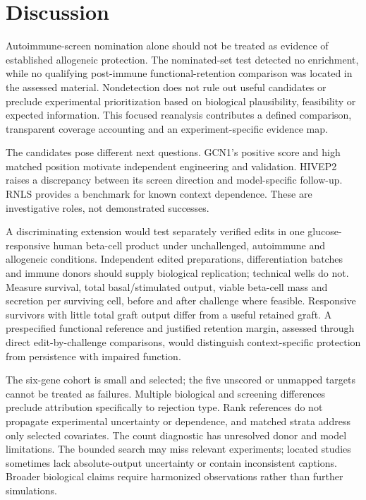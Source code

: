 \documentclass[11pt,letterpaper]{article}
\begin{document}
\section*{Discussion}
Autoimmune-screen nomination alone should not be treated as evidence of established allogeneic protection. The nominated-set test detected no enrichment, while no qualifying post-immune functional-retention comparison was located in the assessed material. Nondetection does not rule out useful candidates or preclude experimental prioritization based on biological plausibility, feasibility or expected information. This focused reanalysis contributes a defined comparison, transparent coverage accounting and an experiment-specific evidence map.\par
The candidates pose different next questions. GCN1's positive score and high matched position motivate independent engineering and validation. HIVEP2 raises a discrepancy between its screen direction and model-specific follow-up. RNLS provides a benchmark for known context dependence. These are investigative roles, not demonstrated successes.\par
A discriminating extension would test separately verified edits in one glucose-responsive human beta-cell product under unchallenged, autoimmune and allogeneic conditions. Independent edited preparations, differentiation batches and immune donors should supply biological replication; technical wells do not. Measure survival, total basal/stimulated output, viable beta-cell mass and secretion per surviving cell, before and after challenge where feasible. Responsive survivors with little total graft output differ from a useful retained graft. A prespecified functional reference and justified retention margin, assessed through direct edit-by-challenge comparisons, would distinguish context-specific protection from persistence with impaired function.\par
The six-gene cohort is small and selected; the five unscored or unmapped targets cannot be treated as failures. Multiple biological and screening differences preclude attribution specifically to rejection type. Rank references do not propagate experimental uncertainty or dependence, and matched strata address only selected covariates. The count diagnostic has unresolved donor and model limitations. The bounded search may miss relevant experiments; located studies sometimes lack absolute-output uncertainty or contain inconsistent captions. Broader biological claims require harmonized observations rather than further simulations.\par
\end{document}
